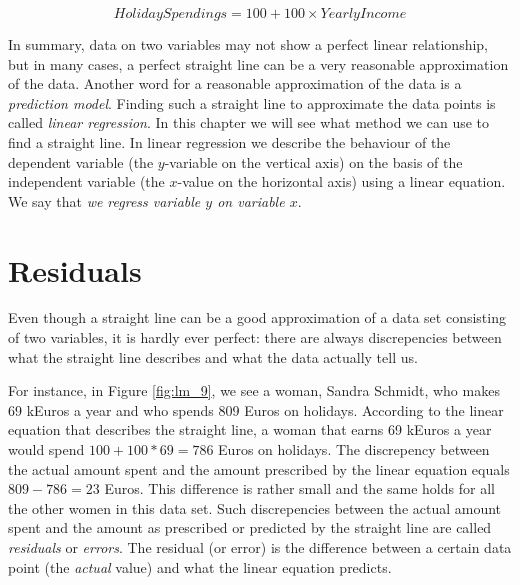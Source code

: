 \documentclass[]{book}\usepackage[]{graphicx}\usepackage[]{color}
\begin{document}
\begin{equation}
HolidaySpendings = 100 + 100 \times YearlyIncome
\end{equation}

In summary, data on two variables may not show a perfect linear relationship, but in many cases, a perfect straight line can be a very reasonable approximation of the data. Another word for a reasonable approximation of the data is a \textit{prediction model}. Finding such a straight line to approximate the data points is called \textit{linear regression}. In this chapter we will see what method we can use to find a straight line. In linear regression we describe the behaviour of the dependent variable (the $y$-variable on the vertical axis) on the basis of the independent variable (the $x$-value on the horizontal axis) using a linear equation. We say that \textit{we regress variable $y$ on variable $x$}.




\section{Residuals}

Even though a straight line can be a good approximation of a data set consisting of two variables, it is hardly ever perfect: there are always discrepencies between what the straight line describes and what the data actually tell us.

For instance, in Figure \ref{fig:lm_9}, we see a woman, Sandra Schmidt, who makes 69 kEuros a year and who spends 809 Euros on holidays. According to the linear equation that describes the straight line, a woman that earns 69 kEuros a year would spend $100 + 100 * 69= 786$ Euros on holidays. The discrepency between the actual amount spent and the amount prescribed by the linear equation equals $809-786=23$ Euros. This difference is rather small and the same holds for all the other women in this data set. Such discrepencies between the actual amount spent and the amount as prescribed or predicted by the straight line are called \textit{residuals} or \textit{errors}. The residual (or error) is the difference between a certain data point (the \textit{actual} value) and what the linear equation predicts.


\end{document}

